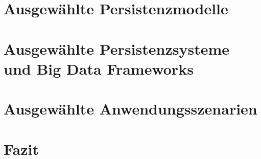 \documentclass[12pt, bibliography=totoc, a4paper, abstractoff, numbers=noenddot]{scrreprt}
\begin{document}


%



\tableofcontents\newpage



\chapter{Ausgewählte Persistenzmodelle}

\chapter{Ausgewählte Persistenzsysteme und Big Data Frameworks}

\chapter{Ausgewählte Anwendungsszenarien}


\chapter{Fazit}






\newpage



% 


%



%
\end{document}
